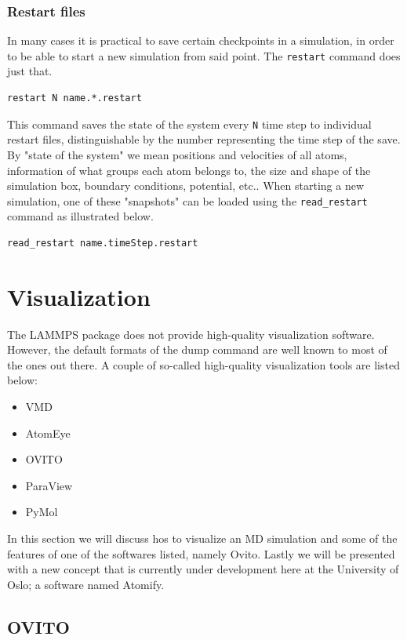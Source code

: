 \documentclass[twoside,english]{uiofysmaster}
\begin{document}
\subsubsection{Restart files}
In many cases it is practical to save certain checkpoints in a simulation, in order to be able to start a new simulation from said point. 
The \texttt{restart} command does just that. 
\begin{lstlisting}[language=LammpsInput]
restart N name.*.restart
\end{lstlisting} 
This command saves the state of the system every \texttt{N} time step to individual restart files, distinguishable by the number representing the time step of the save. 
By "state of the system" we mean positions and velocities of all atoms, information of what groups each atom belongs to, the size and shape of the simulation box, boundary conditions, potential,  etc.. 
When starting a new simulation, one of these "snapshots" can be loaded using the \texttt{read\_restart} command as illustrated below.
\begin{lstlisting}[language=LammpsInput]
read_restart name.timeStep.restart
\end{lstlisting} 



\section{Visualization}
The LAMMPS package does not provide high-quality visualization software. However, the default formats of the dump command are well known to most of the ones out there. 
A couple of so-called high-quality visualization tools are listed below:
\begin{itemize}
	\item VMD
	\item AtomEye
	\item OVITO
	\item ParaView
	\item PyMol 
\end{itemize}
In this section we will discuss hos to visualize an MD simulation and some of the features of one of the softwares listed, namely Ovito. Lastly we will be presented with a new concept that is currently under development here at the University of Oslo; a software named Atomify.

\subsection{OVITO}
\end{document}
